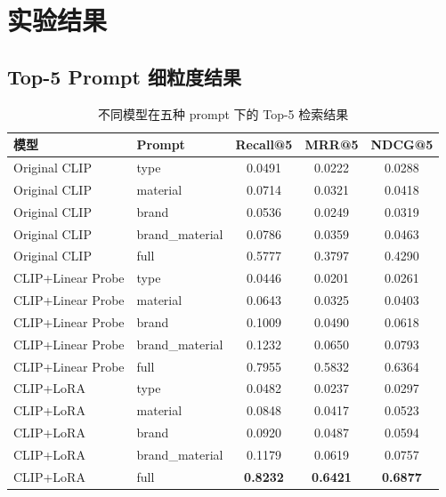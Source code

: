 \documentclass[11pt, a4paper]{ctexart}
\begin{document}
\section{实验结果}

\subsection{Top-5 Prompt 细粒度结果}

\begin{table}[!htbp]
    \centering
    \caption{不同模型在五种 prompt 下的 Top-5 检索结果}
    \label{tab:top5-prompt}
    \small
    \begin{tabular}{llccc}
        \toprule
        \textbf{模型} & \textbf{Prompt} & \textbf{Recall@5} & \textbf{MRR@5} & \textbf{NDCG@5} \\
        \midrule
        Original CLIP & type & 0.0491 & 0.0222 & 0.0288 \\
        Original CLIP & material & 0.0714 & 0.0321 & 0.0418 \\
        Original CLIP & brand & 0.0536 & 0.0249 & 0.0319 \\
        Original CLIP & brand\_material & 0.0786 & 0.0359 & 0.0463 \\
        Original CLIP & full & 0.5777 & 0.3797 & 0.4290 \\
        \midrule
        CLIP+Linear Probe & type & 0.0446 & 0.0201 & 0.0261 \\
        CLIP+Linear Probe & material & 0.0643 & 0.0325 & 0.0403 \\
        CLIP+Linear Probe & brand & 0.1009 & 0.0490 & 0.0618 \\
        CLIP+Linear Probe & brand\_material & 0.1232 & 0.0650 & 0.0793 \\
        CLIP+Linear Probe & full & 0.7955 & 0.5832 & 0.6364 \\
        \midrule
        CLIP+LoRA & type & 0.0482 & 0.0237 & 0.0297 \\
        CLIP+LoRA & material & 0.0848 & 0.0417 & 0.0523 \\
        CLIP+LoRA & brand & 0.0920 & 0.0487 & 0.0594 \\
        CLIP+LoRA & brand\_material & 0.1179 & 0.0619 & 0.0757 \\
        CLIP+LoRA & full & \textbf{0.8232} & \textbf{0.6421} & \textbf{0.6877} \\
        \bottomrule
    \end{tabular}
\end{table}
\FloatBarrier
\end{document}
